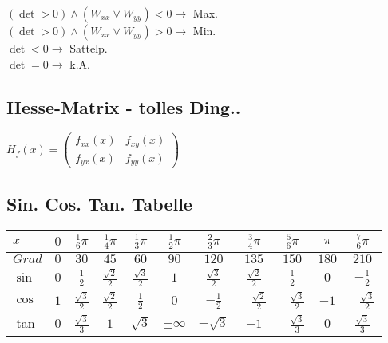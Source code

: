 \documentclass[a4paper,landscape, 11pt]{article}
\begin{document}
\begin{multicols}{5}
\begin{small}
       \noindent
       $(\det>0) \land (W_{xx} \lor W_{yy})<0 \rightarrow$ Max.\\
       $(\det>0) \land (W_{xx} \lor W_{yy})>0 \rightarrow$ Min.\\
       $\det<0 \rightarrow$ Sattelp.\\
       $\det=0 \rightarrow$ k.A.
       
       
              \subsection{Hesse-Matrix - tolles Ding..}
       $H_f(x) = \left( 
       \begin{matrix}
       f_{xx}(x) & f_{xy}(x) \\
       f_{yx}(x) & f_{yy}(x)
       \end{matrix}
       \right)
       $
       
    \end{small}
    \end{multicols}
	\begin{small}
	\begin{multicols}{2}
		\section{Sin. Cos. Tan. Tabelle}
       \begin{tabular}{l | c  c  c  c  c  c  c  c  c  c }
       	\noindent
       	$x$ & $0$ & $\frac{1}{6}\pi$ & $\frac{1}{4}\pi$ & $\frac{1}{3}\pi$ & $\frac{1}{2}\pi$ & $\frac{2}{3}\pi$ & $\frac{3}{4}\pi$ & $\frac{5}{6}\pi$ & $\pi$ & $\frac{7}{6}\pi$\\\hline
       	$Grad$ & $0$ & $30$ & $45$ & $60$ & $90$ & $120$ & $135$ & $150$ & $180$ & $210$\\\hline
       	$\sin$ & $0$ & $\frac{1}{2}$ & $\frac{\sqrt{2}}{2}$ & $\frac{\sqrt{3}}{2}$ & $1$ & $\frac{\sqrt{3}}{2}$ & $\frac{\sqrt{2}}{2}$ & $\frac{1}{2}$ & $0$ & $-\frac{1}{2}$\\\hline
       	$\cos$ & $1$ & $\frac{\sqrt{3}}{2}$ & $\frac{\sqrt{2}}{2}$ & $\frac{1}{2}$ & $0$ & $-\frac{1}{2}$ & $-\frac{\sqrt{2}}{2}$ & $-\frac{\sqrt{3}}{2}$ & $-1$ & $-\frac{\sqrt{3}}{2}$\\\hline
       	$\tan$ & $0$ & $\frac{\sqrt{3}}{3}$ & $1$ & $\sqrt{3}$ &$\pm\infty$ & $-\sqrt{3}$ & $-1$ & $-\frac{\sqrt{3}}{3}$ & $0$ & $\frac{\sqrt{3}}{3}$
       	
       	
       \end{tabular}
    
    \end{multicols}
\end{small}
\end{document}

